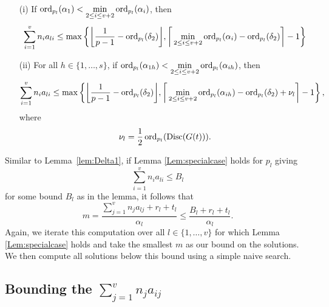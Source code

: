 \begin{lemma} \label{Lem:specialcase} \
\begin{enumerate}
\item[(i)] If $\operatorname{ord}_{p_l}(\alpha_1) < \displaystyle \min_{2 \leq i \leq v+2} \operatorname{ord}_{p_l}(\alpha_i)$, then
\[\sum_{i = 1}^v n_i a_{li} \leq \max \left\{ \bigg\lfloor{\frac{1}{p-1} - \operatorname{ord}_{p_l}(\delta_2)}\bigg\rfloor,  \bigg \lceil\displaystyle \min_{2 \leq i \leq v+2} \operatorname{ord}_{p_l}(\alpha_{i}) - \operatorname{ord}_{p_l}(\delta_2) \bigg \rceil - 1 \right\}\]

\item[(ii)] For all $h \in \{1, \dots, s\}$, if $\operatorname{ord}_{p_l}(\alpha_{1h}) < \displaystyle \min_{2 \leq i \leq v+2} \operatorname{ord}_{p_l}(\alpha_{ih})$, then
\[\sum_{i = 1}^v n_i a_{li} \leq \max \left\{ \bigg\lfloor{\frac{1}{p-1} - \operatorname{ord}_{p_l}(\delta_2)}\bigg\rfloor, \bigg \lceil \displaystyle \min_{2 \leq i \leq v+2} \operatorname{ord}_{p_l}(\alpha_{ih})- \operatorname{ord}_{p_l}(\delta_2) + \nu_l \bigg \rceil - 1\right\},\]
where 
\[\nu_l = \frac{1}{2}\operatorname{ord}_{p_l}(\text{Disc}(G(t))).\]
\end{enumerate}
\end{lemma}

Similar to Lemma~\ref{lem:Delta1}, if Lemma \ref{Lem:specialcase} holds for $p_l$ giving
\[\sum_{i = 1}^v n_i a_{li} \leq B_l\]
for some bound $B_l$ as in the lemma, it follows that
\[m = \frac{\sum_{j = 1}^{v}n_ja_{lj} + r_l + t_l}{\alpha_l} \leq \frac{B_l + r_l + t_l}{\alpha_l}. \]
Again, we iterate this computation over all $l \in \{1, \dots, v \}$ for which Lemma \ref{Lem:specialcase} holds and take the smallest $m$ as our bound on the solutions. We then compute all solutions below this bound using a simple naive search. 


\subsection{Bounding the $\sum_{j = 1}^v n_ja_{ij}$}

